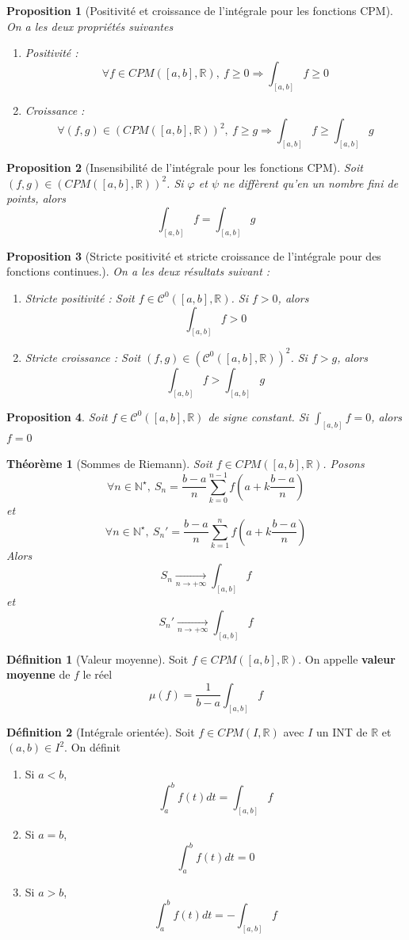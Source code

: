 \documentclass[french]{book}
\newcommand{\N}{\mathbb{N}}
\newcommand{\R}{\mathbb{R}}
\newcommand{\st}{^\star}
\theoremstyle{plain}
\newtheorem{thm}{Théorème}[chapter]
\newtheorem{prop}{Proposition}[chapter]
\theoremstyle{definition}
\newtheorem{dfn}{Définition}[chapter]
\theoremstyle{remark}
\begin{document}
\begin{prop}[Positivité et croissance de l'intégrale pour les fonctions CPM]
	On a les deux propriétés suivantes 
	\begin{enumerate}
		\item Positivité : $$\forall f\in CPM([a,b],\R),\ f\geqslant 0 \Rightarrow \int_{[a,b]}f \geqslant 0$$
		\item Croissance :$$\forall(f,g)\in(CPM([a,b],\R))^2,\ f\geqslant g \Rightarrow \int_{[a,b]}f \geqslant \int_{[a,b]}g$$
	\end{enumerate}
\end{prop}
\begin{prop}[Insensibilité de l'intégrale pour les fonctions CPM]
	Soit $(f,g)\in(CPM([a,b],\R))^2$. Si $\varphi$ et $\psi$ ne diffèrent qu'en un nombre fini de points, alors $$\int_{[a,b]}f = \int_{[a,b]}g$$
\end{prop}
\begin{prop}[Stricte positivité et stricte croissance de l'intégrale pour des fonctions continues.]
	On a les deux résultats suivant :
	\begin{enumerate}
		\item Stricte positivité : Soit $f\in\mathcal{C}^0([a,b],\R)$. Si $f>0$, alors $$\int_{[a,b]}f >0$$
		\item Stricte croissance : Soit $(f,g)\in(\mathcal{C}^0([a,b],\R))^2$. Si $f>g$, alors $$\int_{[a,b]}f >\int_{[a,b]}g$$
	\end{enumerate}
\end{prop}
\begin{prop}
	Soit $f\in\mathcal{C}^0([a,b],\R)$ de signe constant. Si $\displaystyle\int_{[a,b]}f=0$, alors $f=0$
\end{prop}
\begin{thm}[Sommes de Riemann]
	Soit $f\in CPM([a,b],\R)$. Posons $$\forall n\in\N\st, \ S_n=\frac{b-a}{n}\sum_{k=0}^{n-1}f\left(a+k\frac{b-a}{n}\right)$$ et $$\forall n\in\N\st, \ S_n'=\frac{b-a}{n}\sum_{k=1}^{n}f\left(a+k\frac{b-a}{n}\right)$$ Alors $$S_n \xrightarrow[n\to+\infty]{} \int_{[a,b]}f$$ et $$S_n' \xrightarrow[n\to+\infty]{} \int_{[a,b]}f$$
\end{thm}
\begin{dfn}[Valeur moyenne]
	Soit $f\in CPM([a,b],\R)$. On appelle \textbf{valeur moyenne} de $f$ le réel $$\mu(f)=\frac{1}{b-a} \int_{[a,b]}f$$
\end{dfn}
\begin{dfn}[Intégrale orientée]
	Soit $f\in CPM(I,\R)$ avec $I$ un INT de $\R$ et $(a,b)\in I^2$. On définit
	\begin{enumerate}
		\item Si $a<b$, $$\int_{a}^{b}f(t)dt=\int_{[a,b]}f$$
		\item Si $a=b$, $$\int_{a}^{b}f(t)dt=0$$
		\item Si $a>b$, $$\int_{a}^{b}f(t)dt=-\int_{[a,b]}f$$
	\end{enumerate}
\end{dfn}
\end{document}
